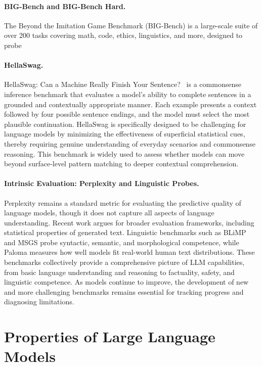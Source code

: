 \paragraph{BIG-Bench and BIG-Bench Hard.} The Beyond the Imitation Game Benchmark (BIG-Bench) \citep{suzgun2023bigbenchhard} is a large-scale suite of over 200 tasks covering math, code, ethics, linguistics, and more, designed to probe

\paragraph{HellaSwag.} HellaSwag: Can a Machine Really Finish Your Sentence?~\citep{zellers2019hellaswag} is a commonsense inference benchmark that evaluates a model's ability to complete sentences in a grounded and contextually appropriate manner. Each example presents a context followed by four possible sentence endings, and the model must select the most plausible continuation. HellaSwag is specifically designed to be challenging for language models by minimizing the effectiveness of superficial statistical cues, thereby requiring genuine understanding of everyday scenarios and commonsense reasoning. This benchmark is widely used to assess whether models can move beyond surface-level pattern matching to deeper contextual comprehension.

\paragraph{Intrinsic Evaluation: Perplexity and Linguistic Probes.} Perplexity \citep{jelinek1977perplexity} remains a standard metric for evaluating the predictive quality of language models, though it does not capture all aspects of language understanding. Recent work \citep{magnusson2024paloma} argues for broader evaluation frameworks, including statistical properties of generated text. Linguistic benchmarks such as BLiMP \citep{warstadt2020blimp} and MSGS \citep{warstadt2020msgs} probe syntactic, semantic, and morphological competence, while Paloma \citep{magnusson2024paloma} measures how well models fit real-world human text distributions.
These benchmarks collectively provide a comprehensive picture of LLM capabilities, from basic language understanding and reasoning to factuality, safety, and linguistic competence. As models continue to improve, the development of new and more challenging benchmarks remains essential for tracking progress and diagnosing limitations.

\section{Properties of Large Language Models}

